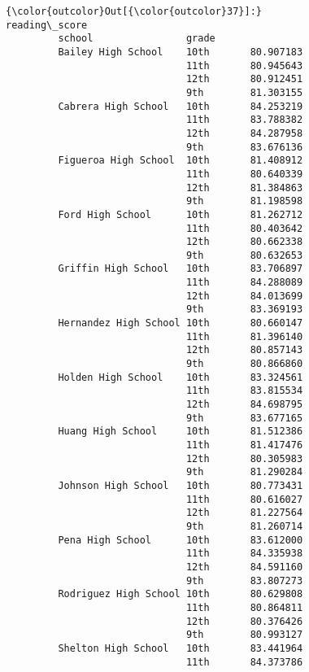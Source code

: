 \documentclass[11pt]{article}
\begin{document}
\begin{Verbatim}[commandchars=\\\{\}]
{\color{outcolor}Out[{\color{outcolor}37}]:}                              reading\_score
         school                grade               
         Bailey High School    10th       80.907183
                               11th       80.945643
                               12th       80.912451
                               9th        81.303155
         Cabrera High School   10th       84.253219
                               11th       83.788382
                               12th       84.287958
                               9th        83.676136
         Figueroa High School  10th       81.408912
                               11th       80.640339
                               12th       81.384863
                               9th        81.198598
         Ford High School      10th       81.262712
                               11th       80.403642
                               12th       80.662338
                               9th        80.632653
         Griffin High School   10th       83.706897
                               11th       84.288089
                               12th       84.013699
                               9th        83.369193
         Hernandez High School 10th       80.660147
                               11th       81.396140
                               12th       80.857143
                               9th        80.866860
         Holden High School    10th       83.324561
                               11th       83.815534
                               12th       84.698795
                               9th        83.677165
         Huang High School     10th       81.512386
                               11th       81.417476
                               12th       80.305983
                               9th        81.290284
         Johnson High School   10th       80.773431
                               11th       80.616027
                               12th       81.227564
                               9th        81.260714
         Pena High School      10th       83.612000
                               11th       84.335938
                               12th       84.591160
                               9th        83.807273
         Rodriguez High School 10th       80.629808
                               11th       80.864811
                               12th       80.376426
                               9th        80.993127
         Shelton High School   10th       83.441964
                               11th       84.373786

\end{Verbatim}
\end{document}
